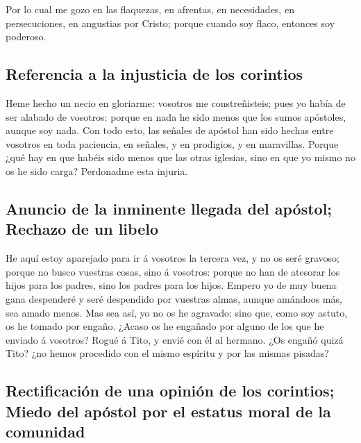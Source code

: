  Por lo cual me gozo en las flaquezas, en afrentas, en
necesidades, en persecuciones, en angustias por Cristo; porque cuando
soy flaco, entonces soy poderoso.

\hypertarget{referencia-a-la-injusticia-de-los-corintios}{%
\subsection{Referencia a la injusticia de los
corintios}\label{referencia-a-la-injusticia-de-los-corintios}}

 Heme hecho un necio en gloriarme: vosotros me
constreñisteis; pues yo había de ser alabado de vosotros: porque en nada
he sido menos que los sumos apóstoles, aunque soy nada. 
Con todo esto, las señales de apóstol han sido hechas entre vosotros en
toda paciencia, en señales, y en prodigios, y en maravillas.
 Porque ¿qué hay en que habéis sido menos que las otras
iglesias, sino en que yo mismo no os he sido carga? Perdonadme esta
injuria.

\hypertarget{anuncio-de-la-inminente-llegada-del-apuxf3stol-rechazo-de-un-libelo}{%
\subsection{Anuncio de la inminente llegada del apóstol; Rechazo de un
libelo}\label{anuncio-de-la-inminente-llegada-del-apuxf3stol-rechazo-de-un-libelo}}

 He aquí estoy aparejado para ir á vosotros la tercera vez,
y no os seré gravoso; porque no busco vuestras cosas, sino á vosotros:
porque no han de atesorar los hijos para los padres, sino los padres
para los hijos.  Empero yo de muy buena gana despenderé y
seré despendido por vuestras almas, aunque amándoos más, sea amado
menos.  Mas sea así, yo no os he agravado: sino que, como
soy astuto, os he tomado por engaño.  ¿Acaso os he engañado
por alguno de los que he enviado á vosotros?  Rogué á Tito,
y envié con él al hermano. ¿Os engañó quizá Tito? ¿no hemos procedido
con el mismo espíritu y por las mismas pisadas?

\hypertarget{rectificaciuxf3n-de-una-opiniuxf3n-de-los-corintios-miedo-del-apuxf3stol-por-el-estatus-moral-de-la-comunidad}{%
\subsection{Rectificación de una opinión de los corintios; Miedo del
apóstol por el estatus moral de la
comunidad}\label{rectificaciuxf3n-de-una-opiniuxf3n-de-los-corintios-miedo-del-apuxf3stol-por-el-estatus-moral-de-la-comunidad}}

